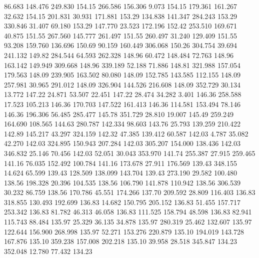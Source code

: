   86.683  148.476  249.830       154.15
 266.586  156.306    9.073       154.15
 179.361  161.267   32.632       154.15
 201.831   30.931  171.881       153.29
 134.838  141.347  284.243       153.29
 330.846   31.407   69.180       153.29
 147.770   23.523  172.196       152.42
 253.510  169.671   40.875       151.55
 267.560  145.777  261.497       151.55
 260.497   31.240  129.409       151.55
  93.208  159.760  136.696       150.69
  90.159  160.449  306.068       150.26
 304.754   39.694  241.132       149.82
 284.544   64.593  262.328       148.96
  60.472  148.484   72.763       148.96
 163.142  149.949  309.668       148.96
 339.189   52.188   71.886       148.81
 321.988  157.054  179.563       148.09
 239.905  163.502   80.080       148.09
 152.785  143.585  112.155       148.09
 257.981   30.965  291.012       148.09
 326.904  144.526  216.608       148.09
 352.729   30.134   13.772       147.22
  24.871   53.507   22.451       147.22
  28.474   34.282    3.401       146.36
 258.588   17.523  105.213       146.36
 170.703  147.522  161.413       146.36
 114.581  153.494   78.146       146.36
 196.306   56.485  285.477       145.78
 351.729   28.810   19.007       145.49
 259.249  164.690  108.565       144.63
 280.787  142.334   98.603       143.76
  25.793  139.259  210.422       142.89
 145.217   43.297  324.159       142.32
  47.385  139.412   60.587       142.03
   4.787   35.082   42.270       142.03
 324.895  150.943  207.284       142.03
 305.207  154.000  138.436       142.03
 346.832   25.146   70.456       142.03
  52.051   30.043  353.970       141.74
 255.387   27.915  259.465       141.16
  76.035  152.492  100.784       141.16
 173.678   27.911  176.569       139.43
 348.155   14.624   65.599       139.43
 128.509  138.099  143.704       139.43
 273.190   29.582  100.480       138.56
 198.328   20.396  104.535       138.56
 106.790  141.878  110.942       138.56
 306.539   30.232   86.759       138.56
 170.786   45.551  174.266       137.70
 209.592   28.809  116.403       136.83
 318.855  130.493  192.699       136.83
  14.682  150.795  205.152       136.83
  51.455  157.717  253.342       136.83
  81.782   46.313   46.058       136.83
 111.525  158.794   48.598       136.83
  82.941  115.743   88.484       135.97
  25.329   36.135   34.878       135.97
 280.319   25.462  132.607       135.97
 122.644  156.900  268.998       135.97
  52.271  153.276  220.879       135.10
 194.019  143.728  167.876       135.10
 359.238  157.008  202.218       135.10
  39.958   28.518  345.847       134.23
 352.048   12.780   77.432       134.23
